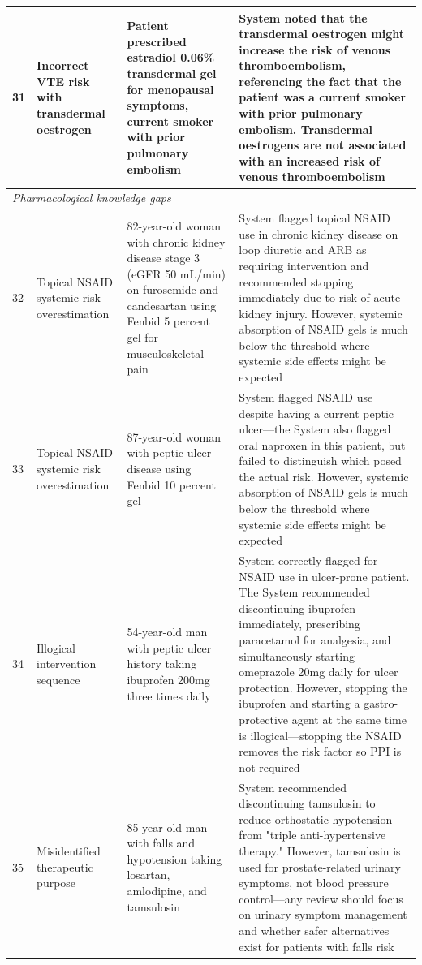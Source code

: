 {\begin{longtable}{p{}p{}p{}p{}}
                \midrule
                \hypertarget{vignette-31}{31} & Incorrect VTE risk with transdermal oestrogen & Patient prescribed estradiol 0.06\% transdermal gel for menopausal symptoms, current smoker with prior pulmonary embolism & System noted that the transdermal oestrogen might increase the risk of venous thromboembolism, referencing the fact that the patient was a current smoker with prior pulmonary embolism. Transdermal oestrogens are not associated with an increased risk of venous thromboembolism \\
                \midrule
                \multicolumn{4}{l}{\textit{Pharmacological knowledge gaps}} \\
                \midrule
                \hypertarget{vignette-32}{32} & Topical NSAID systemic risk overestimation & 82-year-old woman with chronic kidney disease stage 3 (eGFR 50 mL/min) on furosemide and candesartan using Fenbid 5 percent gel for musculoskeletal pain & System flagged topical NSAID use in chronic kidney disease on loop diuretic and ARB as requiring intervention and recommended stopping immediately due to risk of acute kidney injury. However, systemic absorption of NSAID gels is much below the threshold where systemic side effects might be expected \\
                \midrule
                \hypertarget{vignette-33}{33} & Topical NSAID systemic risk overestimation & 87-year-old woman with peptic ulcer disease using Fenbid 10 percent gel & System flagged NSAID use despite having a current peptic ulcer—the System also flagged oral naproxen in this patient, but failed to distinguish which posed the actual risk. However, systemic absorption of NSAID gels is much below the threshold where systemic side effects might be expected \\
                \midrule
                \hypertarget{vignette-34}{34} & Illogical intervention sequence & 54-year-old man with peptic ulcer history taking ibuprofen 200mg three times daily & System correctly flagged for NSAID use in ulcer-prone patient. The System recommended discontinuing ibuprofen immediately, prescribing paracetamol for analgesia, and simultaneously starting omeprazole 20mg daily for ulcer protection. However, stopping the ibuprofen and starting a gastro-protective agent at the same time is illogical—stopping the NSAID removes the risk factor so PPI is not required \\
                \midrule
                \hypertarget{vignette-35}{35} & Misidentified therapeutic purpose & 85-year-old man with falls and hypotension taking losartan, amlodipine, and tamsulosin & System recommended discontinuing tamsulosin to reduce orthostatic hypotension from "triple anti-hypertensive therapy." However, tamsulosin is used for prostate-related urinary symptoms, not blood pressure control—any review should focus on urinary symptom management and whether safer alternatives exist for patients with falls risk \\

\end{longtable}}
